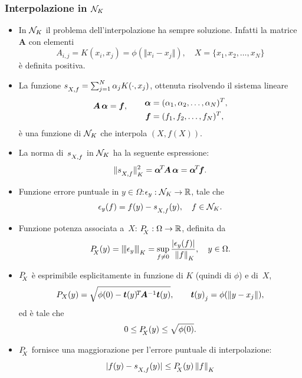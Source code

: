 \documentclass[10pt]{beamer}
\theoremstyle{definition}
\theoremstyle{plain}
\def\R{\mathbb R}
\def\Cal#1{{\cal #1}}
\def\norm#1{\Vert #1\Vert}
\def\opnorm#1{|\mskip-1.5mu|\mskip-1.5mu|#1|\mskip-1.5mu|\mskip-1.5mu|}
\def\lK{{\lower.5ex\hbox{$\scriptstyle K$}}}
\def\lX{{\!\!\lower.5ex\hbox{$\scriptstyle X$}}}
\def\lXf{{\lower.5ex\hbox{$\scriptstyle X, f$}}}
\begin{document}
\begin{frame}
\frametitle{Interpolazione in $\Cal N_K$}
\begin{itemize}
\item 
In $\Cal N_K$ il problema dell’interpolazione ha sempre soluzione.  Infatti la matrice $\bm A$ con elementi
$$
A_{i,j} = K(x_i, x_j) = \phi( \norm{x_i-x_j}), \quad  X=\{x_1,x_2,\dots,x_N\}
$$
è definita positiva.

\item
La funzione $s_\lXf = \sum_{j=1}^N \alpha_j K(\cdot, x_j)$, ottenuta risolvendo il sistema lineare
 $$
 \bm A\,\bm\alpha = \bm f, \qquad  \lower1ex\hbox{$\begin{aligned} 
 								\bm\alpha &= (\alpha_1,\alpha_2,\dots,\alpha_N)^T, \\
								\bm f &= (f_1,f_2,\dots,f_N)^T,
								\end{aligned}$}
$$
è una funzione di $\Cal N_K$ che interpola $(X, f(X))$.
\item
La norma di~$s_\lXf$ in $\Cal N_K$ ha la seguente espressione:
$$
\norm{s_\lXf}^2_\lK= \bm\alpha^{\!T\!}\bm A\,\bm\alpha = \bm\alpha^{\!T\!}\bm f.
$$
\end{itemize}
\end{frame}


\begin{frame}
\begin{itemize}
\item
Funzione \alert{errore puntuale} in $y\in\Omega$:\quad $\epsilon_y:\Cal N_K\to\R$, tale che 
$$
\epsilon_y(f) = f(y)-s_\lXf(y),\quad f\in\Cal N_K.
$$

\item
\alert{Funzione potenza} associata a~$X$: \quad $P_{\lX}:\Omega\to\R$, definita da
$$
P_\lX(y) = \opnorm{\epsilon_y}_\lK = \sup_{f\neq 0} \frac{|\epsilon_y(f)|}{\,\,\norm f_\lK}, \quad y\in\Omega.
$$

\item 
$P_\lX$ è esprimibile esplicitamente in funzione di $K$ (quindi di $\phi$) e di~$X$,
$$
P_X(y) = \sqrt{\phi(0)-\bm t(y)^{\!T\!}\bm A^{-1} \bm t(y)},\qquad \bm t(y)_{\lower.4ex\hbox{$\scriptstyle j$}} = \phi(\norm{y-x_j}),
$$
ed è tale che
$$
0\leq P_\lX(y)\leq\sqrt{\phi(0)}.
$$


\item
$P_\lX$ fornisce una maggiorazione per  l’errore puntuale di interpolazione:
$$
|f(y)-s_\lXf(y)| \leq P_\lX(y)\, \norm f_\lK
$$

\end{itemize}


\end{frame}
\end{document}
